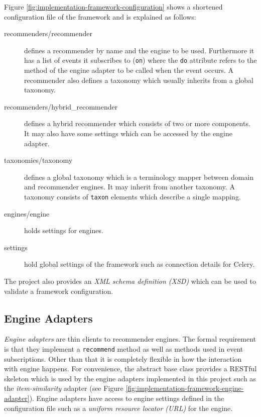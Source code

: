 Figure \ref{fig:implementation-framework-configuration} shows a shortened configuration file of the framework and is explained as follows:

\begin{description}
    \item[recommenders/recommender] defines a recommender by name and the engine to be used. Furthermore it has a list of events it subscribes to (\texttt{on}) where the \texttt{do} attribute refers to the method of the engine adapter to be called when the event occurs. A recommender also defines a taxonomy which usually inherits from a global taxonomy.
    \item[recommenders/hybrid_recommender] defines a hybrid recommender which consists of two or more components. It may also have some settings which can be accessed by the engine adapter.
    \item[taxonomies/taxonomy] defines a global taxonomy which is a terminology mapper between domain and recommender engines. It may inherit from another taxonomy. A taxonomy consists of \texttt{taxon} elements which describe a single mapping.
    \item[engines/engine] holds settings for engines.
    \item[settings] hold global settings of the framework such as connection details for Celery.
\end{description}

The project also provides an \emph{XML schema definition (XSD)} which can be used to validate a framework configuration.

\subsection{Engine Adapters}
\label{implementation-framework-engine-adapter}

\emph{Engine adapters} are thin clients to recommender engines. The formal requirement is that they implement a \texttt{recommend} method as well as methods used in event subscriptions. Other than that it is completely flexible in how the interaction with engine happens. For convenience, the abstract base class provides a RESTful skeleton which is used by the engine adapters implemented in this project such as the \emph{item-similarity} adapter (see Figure \ref{fig:implementation-framework-engine-adapter}). Engine adapters have access to engine settings defined in the configuration file such as a \emph{uniform resource locator (URL)} for the engine.

